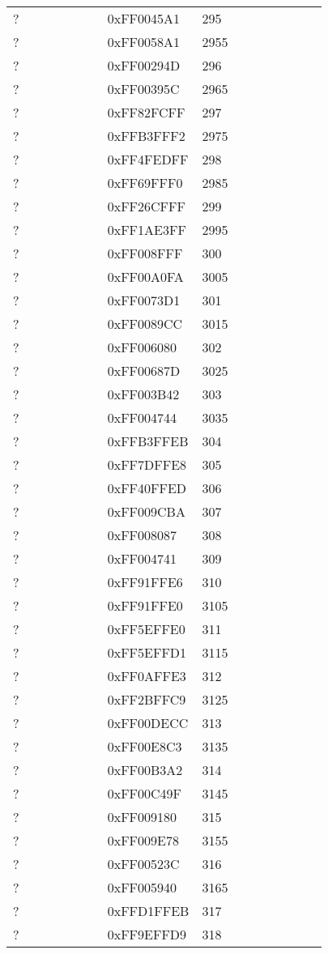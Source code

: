 \begin{longtable}{p{0.3\linewidth} p{0.3\linewidth} p{0.4\linewidth}}
? &  0xFF0045A1 &  295\\
? &  0xFF0058A1 &  2955\\
? &  0xFF00294D &  296\\
? &  0xFF00395C &  2965\\
? &  0xFF82FCFF &  297\\
? &  0xFFB3FFF2 &  2975\\
? &  0xFF4FEDFF &  298\\
? &  0xFF69FFF0 &  2985\\
? &  0xFF26CFFF &  299\\
? &  0xFF1AE3FF &  2995\\
? &  0xFF008FFF &  300\\
? &  0xFF00A0FA &  3005\\
? &  0xFF0073D1 &  301\\
? &  0xFF0089CC &  3015\\
? &  0xFF006080 &  302\\
? &  0xFF00687D &  3025\\
? &  0xFF003B42 &  303\\
? &  0xFF004744 &  3035\\
? &  0xFFB3FFEB &  304\\
? &  0xFF7DFFE8 &  305\\
? &  0xFF40FFED &  306\\
? &  0xFF009CBA &  307\\
? &  0xFF008087 &  308\\
? &  0xFF004741 &  309\\
? &  0xFF91FFE6 &  310\\
? &  0xFF91FFE0 &  3105\\
? &  0xFF5EFFE0 &  311\\
? &  0xFF5EFFD1 &  3115\\
? &  0xFF0AFFE3 &  312\\
? &  0xFF2BFFC9 &  3125\\
? &  0xFF00DECC &  313\\
? &  0xFF00E8C3 &  3135\\
? &  0xFF00B3A2 &  314\\
? &  0xFF00C49F &  3145\\
? &  0xFF009180 &  315\\
? &  0xFF009E78 &  3155\\
? &  0xFF00523C &  316\\
? &  0xFF005940 &  3165\\
? &  0xFFD1FFEB &  317\\
? &  0xFF9EFFD9 &  318\\

\end{longtable}
